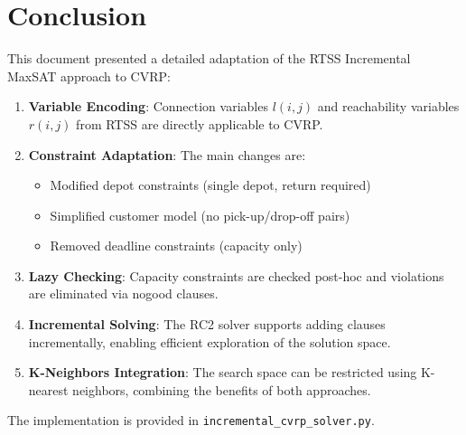 \documentclass[12pt,a4paper]{article}
\theoremstyle{definition}
\begin{document}
\section{Conclusion}

This document presented a detailed adaptation of the RTSS Incremental MaxSAT approach to CVRP:

\begin{enumerate}
    \item \textbf{Variable Encoding}: Connection variables $l(i,j)$ and reachability variables $r(i,j)$ from RTSS are directly applicable to CVRP.
    
    \item \textbf{Constraint Adaptation}: The main changes are:
    \begin{itemize}
        \item Modified depot constraints (single depot, return required)
        \item Simplified customer model (no pick-up/drop-off pairs)
        \item Removed deadline constraints (capacity only)
    \end{itemize}
    
    \item \textbf{Lazy Checking}: Capacity constraints are checked post-hoc and violations are eliminated via nogood clauses.
    
    \item \textbf{Incremental Solving}: The RC2 solver supports adding clauses incrementally, enabling efficient exploration of the solution space.
    
    \item \textbf{K-Neighbors Integration}: The search space can be restricted using K-nearest neighbors, combining the benefits of both approaches.
\end{enumerate}

The implementation is provided in \texttt{incremental\_cvrp\_solver.py}.
\end{document}
